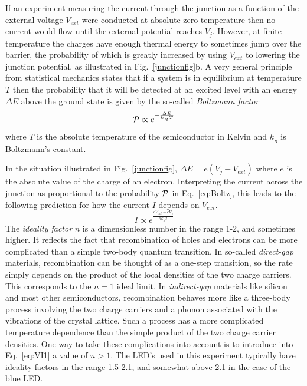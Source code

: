 \documentclass{revtex4}
\begin{document}
If an experiment measuring the current through the junction as a function
of the external voltage $V_{ext}$ were conducted at absolute zero temperature
then no current would flow until the external potential reaches $V_j$.
However, at finite temperature the charges have enough thermal energy to
sometimes jump over the barrier, the probability of which is greatly increased
by using $V_{ext}$ to lowering the junction potential, as illustrated in
Fig.~\ref{junctionfig}b.  A very general principle from statistical mechanics
states that if a system is in equilibrium at temperature $T$ then the
probability that it will be detected at an excited level with an energy
$\Delta E$ above the ground state is given by the so-called {\em
Boltzmann factor}
\begin{equation}
{\cal P} \propto e^{-\frac{\Delta E}{k_{_B} T}}
\label{eq:Boltz}
\end{equation}
where $T$ is the absolute temperature of the semiconductor in Kelvin
and $k_{_B}$ is Boltzmann's constant.

In the situation illustrated in Fig.~\ref{junctionfig},
$\Delta E = e(V_j-V_{ext})$ where $e$ is the absolute value of the charge
of an electron.  Interpreting the current across the junction
as proportional to the probability ${\cal P}$ in Eq.~\ref{eq:Boltz}, this
leads to the following prediction for how the current $I$ depends on $V_{ext}$.
\begin{equation}
I \propto e^{\frac{eV_{ext}-eV_j}{nk_{_B} T}}
\label{eq:VI1}
\end{equation}
The {\em ideality factor} $n$ is a dimensionless number in the range 1-2,
and sometimes higher. It reflects the fact that recombination of holes and
electrons can be more complicated than a simple two-body quantum
transition. In so-called {\em direct-gap} materials, recombination can
be thought of as a one-step transition, so the rate simply depends on
the product of the local densities of the two charge carriers. This
corresponds to the $n=1$ ideal limit. In {\em indirect-gap} materials
like silicon and most other semiconductors, recombination behaves more
like a three-body process involving the two charge carriers and a phonon
associated with the vibrations of the crystal lattice. Such
a process has a more complicated temperature dependence than the simple
product of the two charge carrier densities. One way to take these complications
into account is to introduce into Eq.~\ref{eq:VI1} a value of $n>1$.
The LED's used in this experiment typically have ideality factors in the
range 1.5-2.1, and somewhat above 2.1 in the case of the blue LED.
\end{document}
